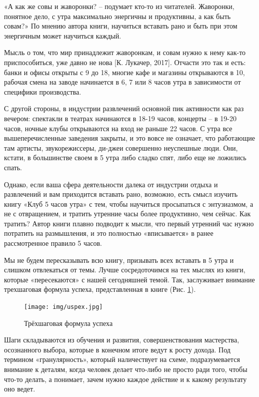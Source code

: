 «А как же совы и жаворонки? – подумает кто-то из читателей. Жаворонки, понятное дело, с утра максимально энергичны и продуктивны, а как быть совам?» По мнению автора книги, научиться вставать рано и быть при этом энергичным может научиться каждый.

Мысль о том, что мир принадлежит жаворонкам, и совам нужно к нему как-то приспособиться, уже давно не нова [К. Лукачер, 2017]. Отчасти это так и есть: банки и офисы открыты с 9 до 18, многие кафе и магазины открываются в 10, рабочая смена на заводе начинается в 6, 7 или 8 часов утра в зависимости от специфики производства.

С другой стороны, в индустрии развлечений основной пик активности как раз вечером: спектакли в театрах начинаются в 18-19 часов, концерты – в 19-20 часов, ночные клубы открываются на вход не раньше 22 часов. С утра все вышеперечисленные заведения закрыты, и это вовсе не означает, что работающие там артисты, звукорежиссеры, ди-джеи совершенно неуспешные люди. Они, кстати, в большинстве своем в 5 утра либо сладко спят, либо еще не ложились спать.

Однако, если ваша сфера деятельности далека от индустрии отдыха и развлечений и вам приходится вставать рано, возможно, есть смысл изучить книгу «Клуб 5 часов утра» с тем, чтобы научиться просыпаться с энтузиазмом, а не с отвращением, и тратить утренние часы более продуктивно, чем сейчас. Как тратить? Автор книги плавно подводит к мысли, что первый утренний час нужно потратить на размышления, и это полностью «вписывается» в ранее рассмотренное правило 5 часов.

Мы не будем пересказывать всю книгу, призывать всех вставать в 5 утра и слишком отвлекаться от темы. Лучше сосредоточимся на тех мыслях из книги, которые «пересекаются» с нашей сегодняшней темой. Так, заслуживает внимание трехшаговая формула успеха, представленная в книге  (Рис. \ref{fig:uspex}).
\begin{figure}[h]
    \centering
    \texttt{[image: img/uspex.jpg]}
    \caption{Трёхшаговая формула успеха}
    \label{fig:uspex}
\end{figure}


Шаги складываются из обучения и развития, совершенствования мастерства, осознанного выбора, которые в конечном итоге ведут к росту дохода. Под термином «гранулярность», который наличествует на схеме, подразумевается внимание к деталям, когда человек делает что-либо не просто ради того, чтобы что-то делать, а понимает, зачем нужно каждое действие и к какому результату оно ведет.


